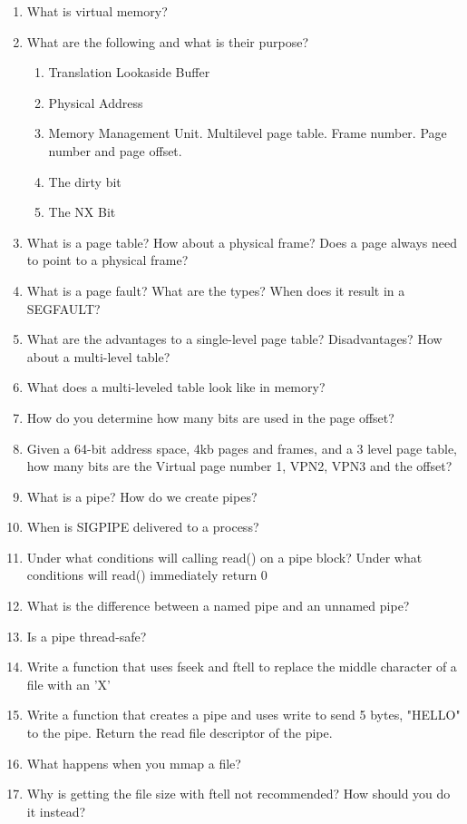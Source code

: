 \begin{enumerate}
	\item What is virtual memory?
	\item What are the following and what is their purpose?
	      \begin{enumerate}
	      	\item Translation Lookaside Buffer
	      	\item Physical Address
	      	\item Memory Management Unit. Multilevel page table. Frame number. Page number and page offset.
	      	\item The dirty bit
	      	\item The NX Bit
	      \end{enumerate}
	\item What is a page table? How about a physical frame? Does a page always need to point to a physical frame?
	\item What is a page fault? What are the types? When does it result in a SEGFAULT?
	\item What are the advantages to a single-level page table? Disadvantages? How about a multi-level table?
	\item What does a multi-leveled table look like in memory?
	\item How do you determine how many bits are used in the page offset?
	\item Given a 64-bit address space, 4kb pages and frames, and a 3 level page table, how many bits are the Virtual page number 1, VPN2, VPN3 and the offset?
	\item What is a pipe? How do we create pipes?
	\item When is SIGPIPE delivered to a process?
	\item Under what conditions will calling read() on a pipe block? Under what conditions will read() immediately return 0
	\item What is the difference between a named pipe and an unnamed pipe?
	\item Is a pipe thread-safe?
	\item Write a function that uses fseek and ftell to replace the middle character of a file with an 'X'
	\item Write a function that creates a pipe and uses write to send 5 bytes, "HELLO" to the pipe. Return the read file descriptor of the pipe.
	\item What happens when you mmap a file?
	\item Why is getting the file size with ftell not recommended? How should you do it instead?
\end{enumerate}
	 


